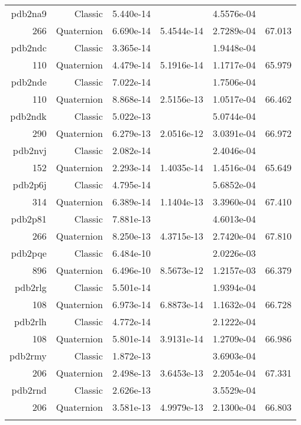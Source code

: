 \begin{xltabular}{\textwidth}{r|rS[table-format=1.3e+2]S[table-format=1.4e+2]S[table-format=1.4e+2]S[table-format=-1.3]}
pdb2na9 & Classic & 5.440e-14 &  & 4.5576e-04 & \\
266 & Quaternion & 6.690e-14 & 5.4544e-14 & 2.7289e-04 & 67.013\\  \addlinespace
pdb2ndc & Classic & 3.365e-14 &  & 1.9448e-04 & \\
110 & Quaternion & 4.479e-14 & 5.1916e-14 & 1.1717e-04 & 65.979\\  \addlinespace
pdb2nde & Classic & 7.022e-14 &  & 1.7506e-04 & \\
110 & Quaternion & 8.868e-14 & 2.5156e-13 & 1.0517e-04 & 66.462\\  \addlinespace
pdb2ndk & Classic & 5.022e-13 &  & 5.0744e-04 & \\
290 & Quaternion & 6.279e-13 & 2.0516e-12 & 3.0391e-04 & 66.972\\  \addlinespace
pdb2nvj & Classic & 2.082e-14 &  & 2.4046e-04 & \\
152 & Quaternion & 2.293e-14 & 1.4035e-14 & 1.4516e-04 & 65.649\\  \addlinespace
pdb2p6j & Classic & 4.795e-14 &  & 5.6852e-04 & \\
314 & Quaternion & 6.389e-14 & 1.1404e-13 & 3.3960e-04 & 67.410\\  \addlinespace
pdb2p81 & Classic & 7.881e-13 &  & 4.6013e-04 & \\
266 & Quaternion & 8.250e-13 & 4.3715e-13 & 2.7420e-04 & 67.810\\  \addlinespace
pdb2pqe & Classic & 6.484e-10 &  & 2.0226e-03 & \\
896 & Quaternion & 6.496e-10 & 8.5673e-12 & 1.2157e-03 & 66.379\\  \addlinespace
pdb2rlg & Classic & 5.501e-14 &  & 1.9394e-04 & \\
108 & Quaternion & 6.973e-14 & 6.8873e-14 & 1.1632e-04 & 66.728\\  \addlinespace
pdb2rlh & Classic & 4.772e-14 &  & 2.1222e-04 & \\
108 & Quaternion & 5.801e-14 & 3.9131e-14 & 1.2709e-04 & 66.986\\  \addlinespace
pdb2rmy & Classic & 1.872e-13 &  & 3.6903e-04 & \\
206 & Quaternion & 2.498e-13 & 3.6453e-13 & 2.2054e-04 & 67.331\\  \addlinespace
pdb2rnd & Classic & 2.626e-13 &  & 3.5529e-04 & \\
206 & Quaternion & 3.581e-13 & 4.9979e-13 & 2.1300e-04 & 66.803\\  \addlinespace

\end{xltabular}

